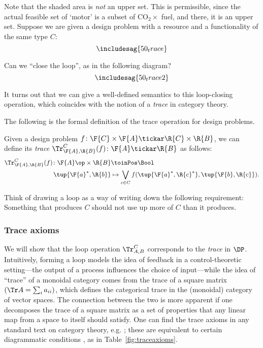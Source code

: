 Note that the shaded area is \emph{not} an upper set. This is permissible, since the actual feasible set of `motor' is a subset of CO$_2 \times$ fuel, and there, it is an upper set.
Suppose we are given a design problem with a resource and a functionality of the same type $C$:
\[
\includesag{50_trace}
\]

Can we ``close the loop'', as in the following diagram?
\[\label{eq:looped}
\includesag{50_trace2}
\]

It turns out that we can give a well-defined semantics to this loop-closing operation, which coincides with the notion of a \emph{trace} in category theory.

The following is the formal definition of the trace operation for design problems.

\begin{definition}
\label{def:dp-trace}
Given a design problem $f\colon \F{C} \times \F{A} \tickar \R{C} \times \R{B}$, we can define
its \emph{trace} $\Tr_{\F{A},\R{B}}^C(f) \colon \F{A} \tickar \R{B}$ as follows:
%
\begin{equation}
\label{eq:tracedef}
\begin{aligned}
	\Tr_{\F{A},\R{B}}^C(f) \colon  \F{A}\op \times \R{B} &\toinPos \Bool \\
	\tup{\F{a}^*, \R{b}} &\mapsto \bigvee_{c\in C}
		f(
			\tup{\F{a}^*, \R{c}^*},
			\tup{\F{b}, \R{c}}
		).
\end{aligned}
\end{equation}
\end{definition}


Think of drawing a loop as a way of writing down the following requirement: Something that produces $C$ should not use up more of $C$ than it produces.


\subsubsection{Trace axioms}
We will show that the loop operation $\Tr_{A,B}^C$ corresponds to the \emph{trace} in $\DP$. Intuitively, forming a loop models the idea of feedback in a control-theoretic setting---the output of a process influences the choice of input---while the idea of ``trace'' of a monoidal category comes from the trace of a square matrix $(\Tr A = \sum_i a_{ii})$, which defines the categorical trace in the (monoidal) category of vector spaces. The connection between the two is more apparent if one decomposes the trace of a square matrix as a set of properties that any linear map from a space to itself should satisfy. One can find the trace axioms in any standard text on category theory, e.g. \cite{maclane}; these are equivalent to certain diagrammatic conditions \cite{joyal96}, as in Table~\ref{fig:traceaxioms}.

